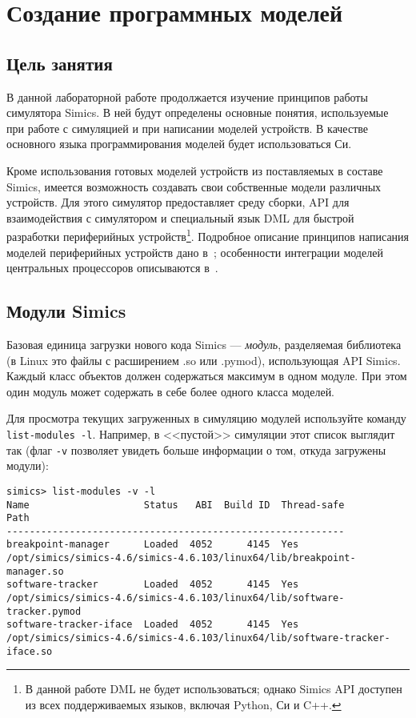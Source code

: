 \chapter{Создание программных моделей}\label{chap:lab-model-builder}

\section{Цель занятия}

В данной лабораторной работе продолжается изучение принципов работы симулятора Simics. В ней будут определены основные понятия, используемые при работе с симуляцией и при написании моделей устройств. В качестве основного языка программирования моделей будет использоваться Си.

Кроме использования готовых моделей устройств из поставляемых в составе Simics, имеется возможность создавать свои собственные модели различных устройств. Для этого симулятор предоставляет среду сборки, API для взаимодействия с симулятором и специальный язык DML для быстрой разработки периферийных устройств\footnote{В данной работе DML не будет использоваться; однако Simics API доступен из всех поддерживаемых языков, включая Python, Си и C++.}. Подробное описание принципов написания моделей периферийных устройств дано в~\cite{model-builder}; особенности интеграции моделей центральных процессоров описываются в~\cite{processor-integration}.

\section{Модули Simics}
Базовая единица загрузки нового кода Simics --- \textit{модуль}, разделяемая библиотека (в Linux это файлы с расширением .so или .pymod), использующая API Simics. Каждый класс объектов должен содержаться максимум в одном модуле. При этом один модуль может содержать в себе более одного класса моделей.

Для просмотра текущих загруженных в симуляцию модулей используйте команду \texttt{list-modules -l}. Например, в <<пустой>> симуляции этот список выглядит так (флаг \texttt{-v} позволяет увидеть больше информации о том, откуда загружены модули):

\begin{lstlisting}
simics> list-modules -v -l
Name                    Status   ABI  Build ID  Thread-safe
Path
-----------------------------------------------------------
breakpoint-manager      Loaded  4052      4145  Yes
/opt/simics/simics-4.6/simics-4.6.103/linux64/lib/breakpoint-manager.so
software-tracker        Loaded  4052      4145  Yes
/opt/simics/simics-4.6/simics-4.6.103/linux64/lib/software-tracker.pymod
software-tracker-iface  Loaded  4052      4145  Yes
/opt/simics/simics-4.6/simics-4.6.103/linux64/lib/software-tracker-iface.so
\end{lstlisting}

